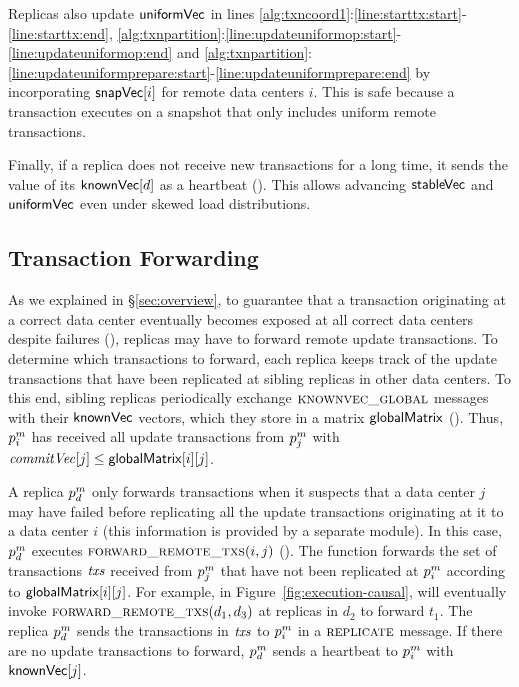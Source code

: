 Replicas also update ${\sf uniformVec}$ in lines
\ref{alg:txncoord1}:\ref{line:starttx:start}-\ref{line:starttx:end},
\ref{alg:txnpartition}:\ref{line:updateuniformop:start}-\ref{line:updateuniformop:end}
and
\ref{alg:txnpartition}:\ref{line:updateuniformprepare:start}-\ref{line:updateuniformprepare:end}
by incorporating $\vecsnapshottime[i]$ for remote data centers $i$. This is
safe because a transaction executes on a snapshot that only includes uniform
remote transactions.

Finally, if a replica does not receive new transactions for a long time, it
sends the value of its ${\sf knownVec}[d]$ as a heartbeat
().
This allows advancing ${\sf stableVec}$ and ${\sf uniformVec}$ even under skewed
load distributions.




\subsection{Transaction Forwarding}
\label{sec:forward}


As we explained in \S\ref{sec:overview}, to guarantee that a transaction
originating at a correct data center eventually becomes exposed at all correct
data centers despite failures (\liveness), replicas may have to forward remote
update transactions. To determine which transactions to forward, each replica
keeps track of the update transactions that have been replicated at sibling
replicas in other data centers. To this end, sibling replicas periodically
exchange $\textsc{knownvec\_global}$ messages with their ${\sf knownVec}$ vectors, which they
store in a matrix ${\sf globalMatrix}$
().
Thus, $\partition^m_i$ has received all update transactions from
$\partition^m_j$ with $\commitvector[j]\leq \rvc[i][j]$.

A replica $\partition^m_d$ only forwards transactions when it suspects that a
data center $j$ may have failed before replicating all the update transactions
originating at it to a data center $i$ (this information is provided by a
separate module).
In this case, $\partition^m_d$ executes $\textsc{forward\_remote\_txs}(i, j)$
(). The function forwards the set of 
transactions $\atxs$ received from $\partition^m_j$ that have not been
replicated at $\partition^m_i$ according to
${\sf globalMatrix}[i][j]$. For example, in
Figure~\ref{fig:execution-causal}, \System will eventually invoke
$\textsc{forward\_remote\_txs}(d_1, d_3)$ at replicas in $d_2$ to forward {\color{\CausalTxColor}$t_1$}. The replica
$\partition^m_d$ sends the transactions in $\atxs$ to $\partition^m_i$ in a $\textsc{replicate}$
message. If there are no update transactions to forward, $\partition^m_d$ sends
a heartbeat to $\partition^m_i$ with ${\sf knownVec}[j]$.





